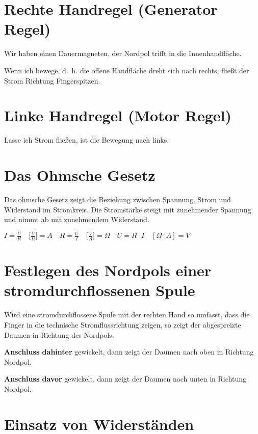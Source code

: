 \section{Rechte Handregel (Generator
Regel)}\label{rechte-handregel-generator-regel}

Wir haben einen Dauermagneten, der Nordpol trifft in die
Innenhandfläche.

Wenn ich bewege, d.~h. die offene Handfläche dreht sich nach rechts,
fließt der Strom Richtung Fingerspitzen.

\section{Linke Handregel (Motor
Regel)}\label{linke-handregel-motor-regel}

Lasse ich Strom fließen, ist die Bewegung nach links.

\section{Das Ohmsche Gesetz}\label{das-ohmsche-gesetz}

Das ohmsche Gesetz zeigt die Beziehung zwischen Spannung, Strom und
Widerstand im Stromkreis. Die Stromstärke steigt mit zunehmender
Spannung und nimmt ab mit zunehmendem Widerstand.

$\boxed{I = \frac{U}{R}} \quad \bigl[\frac{V}{\Omega}\bigl] = A \quad  \boxed{R = \frac{U}{I}} \quad \bigl[\frac{V}{A}\bigl] = \Omega \quad  \boxed{U = R \cdot I} \quad [\Omega \cdot A] = V$

\section{Festlegen des Nordpols einer stromdurchflossenen
Spule}\label{festlegen-des-nordpols-einer-stromdurchflossenen-spule}

Wird eine stromdurchflossene Spule mit der rechten Hand so umfasst, dass
die Finger in die technische Stromflussrichtung zeigen, so zeigt der
abgespreizte Daumen in Richtung des Nordpols.

\textbf{Anschluss dahinter} gewickelt, dann zeigt der Daumen nach oben
in Richtung Nordpol.

\textbf{Anschluss davor} gewickelt, dann zeigt der Daumen nach unten in
Richtung Nordpol.

\section{Einsatz von Widerständen}\label{einsatz-von-widerstaenden}

